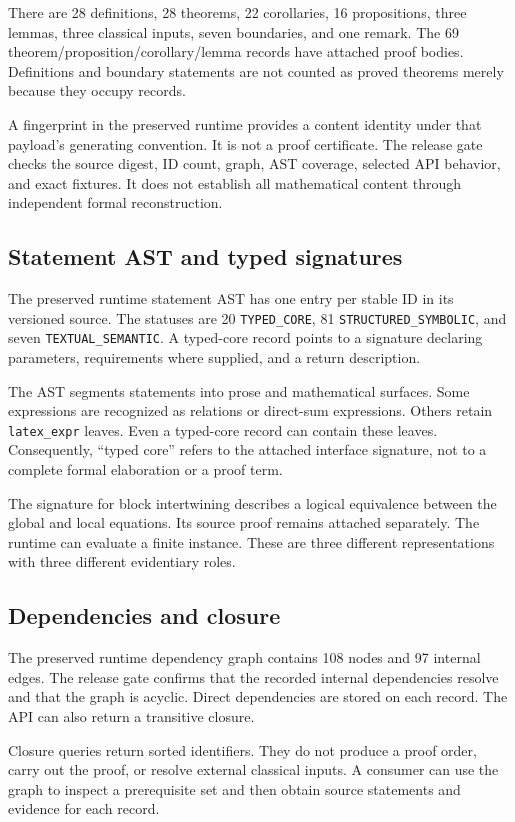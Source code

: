 \documentclass[a4paper,11pt]{article}
\begin{document}
There are 28 definitions, 28 theorems, 22 corollaries, 16 propositions, three lemmas, three classical inputs, seven boundaries, and one remark. The 69 theorem/proposition/corollary/lemma records have attached proof bodies. Definitions and boundary statements are not counted as proved theorems merely because they occupy records.

A fingerprint in the preserved runtime provides a content identity under that payload's generating convention. It is not a proof certificate. The release gate checks the source digest, ID count, graph, AST coverage, selected API behavior, and exact fixtures. It does not establish all mathematical content through independent formal reconstruction.
\subsection{Statement AST and typed signatures}
The preserved runtime statement AST has one entry per stable ID in its versioned source. The statuses are 20 \nolinkurl{TYPED_CORE}, 81 \nolinkurl{STRUCTURED_SYMBOLIC}, and seven \nolinkurl{TEXTUAL_SEMANTIC}. A typed-core record points to a signature declaring parameters, requirements where supplied, and a return description.

The AST segments statements into prose and mathematical surfaces. Some expressions are recognized as relations or direct-sum expressions. Others retain \nolinkurl{latex_expr} leaves. Even a typed-core record can contain these leaves. Consequently, ``typed core'' refers to the attached interface signature, not to a complete formal elaboration or a proof term.

The signature for block intertwining describes a logical equivalence between the global and local equations. Its source proof remains attached separately. The runtime can evaluate a finite instance. These are three different representations with three different evidentiary roles.
\subsection{Dependencies and closure}
The preserved runtime dependency graph contains 108 nodes and 97 internal edges. The release gate confirms that the recorded internal dependencies resolve and that the graph is acyclic. Direct dependencies are stored on each record. The API can also return a transitive closure.

Closure queries return sorted identifiers. They do not produce a proof order, carry out the proof, or resolve external classical inputs. A consumer can use the graph to inspect a prerequisite set and then obtain source statements and evidence for each record.
\end{document}
